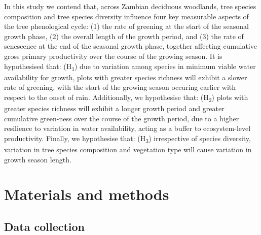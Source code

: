 \documentclass[11pt,a4paper]{article}
\begin{document}

In this study we contend that, across Zambian deciduous woodlands, tree species composition and tree species diversity influence four key measurable aspects of the tree phenological cycle: (1) the rate of greening at the start of the seasonal growth phase, (2) the overall length of the growth period, and (3) the rate of senescence at the end of the seasonal growth phase, together affecting cumulative gross primary productivity over the course of the growing season. It is hypothesised that: (H\textsubscript{1}) due to variation among species in minimum viable water availability for growth, plots with greater species richness will exhibit a slower rate of greening, with the start of the growing season occuring earlier with respect to the onset of rain. Additionally, we hypothesise that: (H\textsubscript{2}) plots with greater species richness will exhibit a longer growth period and greater cumulative green-ness over the course of the growth period, due to a higher resilience to variation in water availability, acting as a buffer to ecosystem-level productivity. Finally, we hypothesise that: (H\textsubscript{3}) irrespective of species diversity, variation in tree species composition and vegetation type will cause variation in growth season length. 

\section{Materials and methods}

\subsection{Data collection}
\end{document}

